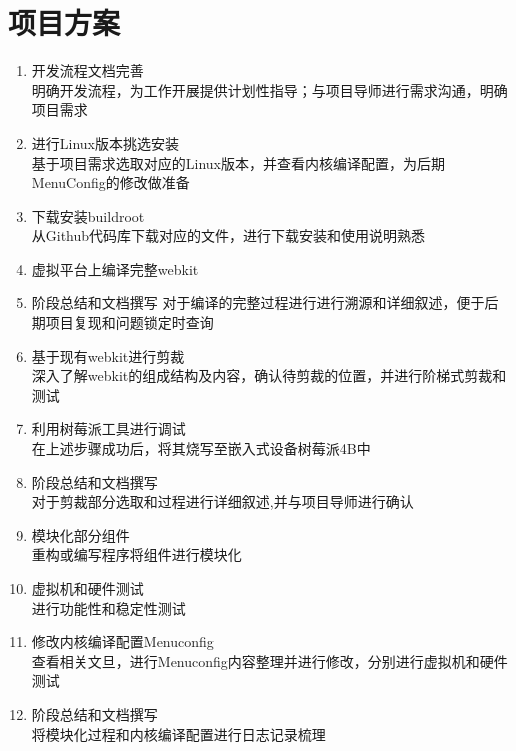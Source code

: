 \documentclass[UTF8,14pt]{article}
\numberwithin{figure}{section}
\begin{document}
\section{项目方案}
\begin{enumerate}
	\item 开发流程文档完善\\
	      明确开发流程，为工作开展提供计划性指导；与项目导师进行需求沟通，明确项目需求
	\item 进行Linux版本挑选安装\\
	      基于项目需求选取对应的Linux版本，并查看内核编译配置，为后期MenuConfig的修改做准备
	\item 下载安装buildroot\\
	      从Github代码库下载对应的文件，进行下载安装和使用说明熟悉
	\item 虚拟平台上编译完整webkit
	\item 阶段总结和文档撰写
	      对于编译的完整过程进行进行溯源和详细叙述，便于后期项目复现和问题锁定时查询
	\item 基于现有webkit进行剪裁\\
	      深入了解webkit的组成结构及内容，确认待剪裁的位置，并进行阶梯式剪裁和测试
	\item 利用树莓派工具进行调试\\
	      在上述步骤成功后，将其烧写至嵌入式设备树莓派4B中
	\item 阶段总结和文档撰写\\
	      对于剪裁部分选取和过程进行详细叙述,并与项目导师进行确认
	\item 模块化部分组件\\
	      重构或编写程序将组件进行模块化
	\item 虚拟机和硬件测试\\
	      进行功能性和稳定性测试
	\item 修改内核编译配置Menuconfig\\
	      查看相关文旦，进行Menuconfig内容整理并进行修改，分别进行虚拟机和硬件测试
	\item 阶段总结和文档撰写\\
	      将模块化过程和内核编译配置进行日志记录梳理
\end{enumerate}
\end{document}
